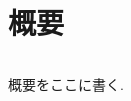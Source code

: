 \documentclass[a4paper, 12pt, dvipdfmx, uplatex]{jsreport}
\begin{document}
\chapter*{概要}
\begin{lstlisting}[caption=name,label=number]
\end{lstlisting}
概要をここに書く.
\end{document}
